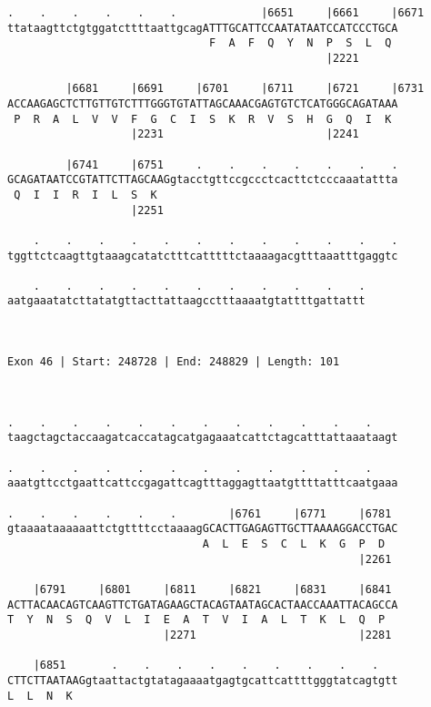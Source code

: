 \documentclass{article}
\begin{document}
\begin{Verbatim}
.    .    .    .    .    .             |6651     |6661     |6671
ttataagttctgtggatcttttaattgcagATTTGCATTCCAATATAATCCATCCCTGCA
                               F  A  F  Q  Y  N  P  S  L  Q 
                                                 |2221      
  
         |6681     |6691     |6701     |6711     |6721     |6731
ACCAAGAGCTCTTGTTGTCTTTGGGTGTATTAGCAAACGAGTGTCTCATGGGCAGATAAA
 P  R  A  L  V  V  F  G  C  I  S  K  R  V  S  H  G  Q  I  K 
                   |2231                         |2241      
  
         |6741     |6751     .    .    .    .    .    .    .
GCAGATAATCCGTATTCTTAGCAAGgtacctgttccgccctcacttctcccaaatattta
 Q  I  I  R  I  L  S  K                                     
                   |2251                                    
  
    .    .    .    .    .    .    .    .    .    .    .    .
tggttctcaagttgtaaagcatatctttcatttttctaaaagacgtttaaatttgaggtc
                                                            
    .    .    .    .    .    .    .    .    .    .    .
aatgaaatatcttatatgttacttattaagcctttaaaatgtattttgattattt
                                                       
                                                       
 
Exon 46 | Start: 248728 | End: 248829 | Length: 101



.    .    .    .    .    .    .    .    .    .    .    .    
taagctagctaccaagatcaccatagcatgagaaatcattctagcatttattaaataagt
                                                            
.    .    .    .    .    .    .    .    .    .    .    .    
aaatgttcctgaattcattccgagattcagtttaggagttaatgttttatttcaatgaaa
                                                            
.    .    .    .    .    .        |6761     |6771     |6781 
gtaaaataaaaaattctgttttcctaaaagGCACTTGAGAGTTGCTTAAAAGGACCTGAC
                              A  L  E  S  C  L  K  G  P  D  
                                                      |2261 
  
    |6791     |6801     |6811     |6821     |6831     |6841 
ACTTACAACAGTCAAGTTCTGATAGAAGCTACAGTAATAGCACTAACCAAATTACAGCCA
T  Y  N  S  Q  V  L  I  E  A  T  V  I  A  L  T  K  L  Q  P  
                        |2271                         |2281 
  
    |6851       .    .    .    .    .    .    .    .    .   
CTTCTTAATAAGgtaattactgtatagaaaatgagtgcattcattttgggtatcagtgtt
L  L  N  K                                                  
                                                            

\end{Verbatim}
\end{document}
